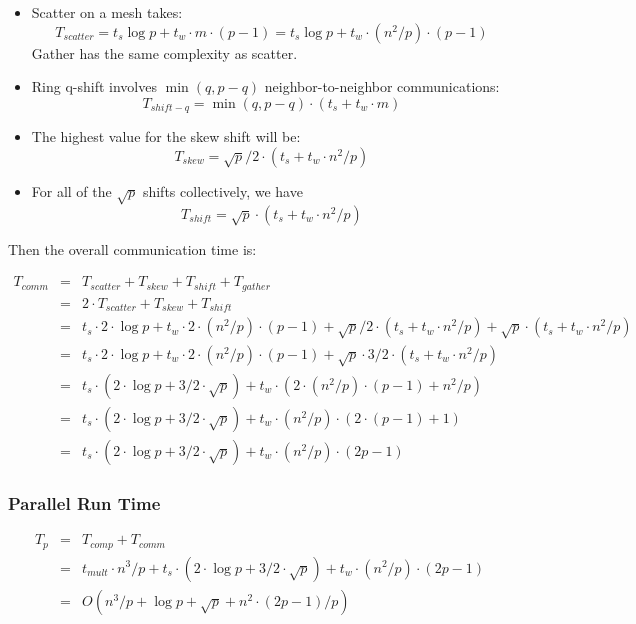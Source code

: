 \documentclass{article}
\begin{document}
\begin{itemize}
	\item Scatter on a mesh takes: $$T_{{scatter}} = t_s
\log{p} + t_w \cdot m  \cdot (p-1) = t_s \log{p} + t_w \cdot (n^2/p) \cdot
(p-1)$$
Gather has the same complexity as scatter.

\item Ring q-shift involves $\min(q, p-q)$ neighbor-to-neighbor communications:
$$T_{{shift-q}} = \min(q,p-q) \cdot (t_s + t_w \cdot m)$$

\item The highest value for the skew shift will be:
$$T_{{skew}} = \sqrt{p}/2 \cdot (t_s + t_w \cdot n^2/p)$$

\item For all of the $\sqrt{p}$ shifts collectively, we have
$$T_{{shift}} = \sqrt{p} \cdot (t_s + t_w \cdot n^2/p)$$

\end{itemize}

Then the overall communication time is:

\begin{eqnarray*}
T_{{comm}} &=& T_{{scatter}} + T_{{skew}} + T_{{shift}} + T_{{gather}} \\
&=& 2 \cdot T_{{scatter}} + T_{{skew}} + T_{{shift}} \\
&=& t_s \cdot 2 \cdot \log{p} + t_w \cdot 2 \cdot (n^2/p) \cdot (p-1) + \sqrt{p}/2  \cdot  (t_s + t_w \cdot n^2/p) + \sqrt{p} \cdot (t_s + t_w \cdot n^2/p)  \\
&=&  t_s \cdot 2 \cdot \log{p} + t_w \cdot 2 \cdot (n^2/p) \cdot (p-1) + \sqrt{p} \cdot 3/2 \cdot  (t_s + t_w \cdot n^2/p) \\
&=& t_s \cdot (2 \cdot \log{p} + 3/2 \cdot \sqrt{p}) + t_w \cdot (2 \cdot (n^2/p) \cdot (p-1) + n^2/p)  \\
&=& t_s \cdot (2 \cdot \log{p} + 3/2 \cdot \sqrt{p}) + t_w \cdot (n^2/p) \cdot (2 \cdot (p-1) + 1)  \\
&=& t_s \cdot (2 \cdot \log{p} + 3/2 \cdot \sqrt{p}) + t_w \cdot (n^2/p) \cdot (2p-1)
\end{eqnarray*}


\subsubsection{Parallel Run Time}

\begin{eqnarray*}
T_p &=& T_{{comp}} + T_{{comm}} \\
&=& t_{{mult}} \cdot n^3 / p + t_s \cdot (2 \cdot \log{p} + 3/2 \cdot \sqrt{p}) + t_w \cdot (n^2/p) \cdot (2p-1) \\
&=& O(n^3 / p + \log{p} + \sqrt{p} + n^2 \cdot (2p-1)/p)
\end{eqnarray*}
\end{document}
